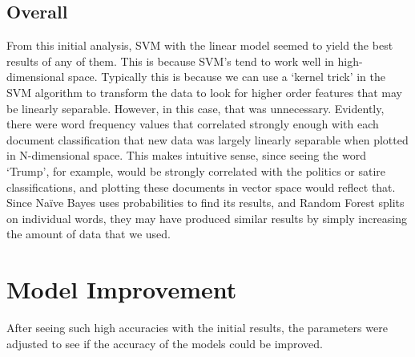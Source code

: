 \documentclass{article}
\begin{document}
        \subsection{Overall}
        From this initial analysis, SVM with the linear model seemed to yield the best results 
        of any of them. This is because SVM’s tend to work well in high-dimensional space. 
        Typically this is because we can use a ‘kernel trick’ in the SVM algorithm to 
        transform the data to look for higher order features that may be linearly separable. 
        However, in this case, that was unnecessary. Evidently, there were word frequency 
        values that correlated strongly enough with each document classification that new data 
        was largely linearly separable when plotted in N-dimensional space. This makes 
        intuitive sense, since seeing the word ‘Trump’, for example, would be strongly 
        correlated with the politics or satire classifications, and plotting these documents 
        in vector space would reflect that. Since Naïve Bayes uses probabilities to find its 
        results, and Random Forest splits on individual words, they may have produced similar 
        results by simply increasing the amount of data that we used.
        
    \section{Model Improvement}
    After seeing such high accuracies with the initial results, the parameters were adjusted to 
    see if the accuracy of the models could be improved.
\end{document}
